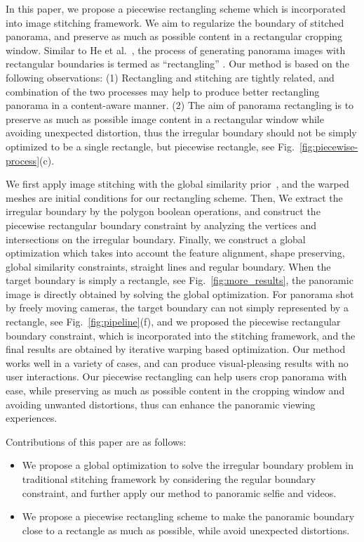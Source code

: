 \documentclass[10pt,journal,compsoc]{IEEEtran}
\begin{document}
In this paper, we propose a piecewise rectangling scheme which is incorporated into image stitching framework.
We aim to regularize the boundary of stitched panorama, and preserve as much as possible content in a  rectangular cropping window.
Similar to He et al.~\cite{journals/tog/HeC013}, the process of generating panorama images with rectangular boundaries is termed as ``rectangling'' . Our method is based on the following observations:
(1) Rectangling and stitching are tightly related, and combination of the two processes may help to produce better rectangling panorama in a content-aware manner.
(2) The aim of panorama rectangling is to preserve as much as possible image content in a rectangular window while avoiding unexpected distortion, thus the irregular boundary should not be simply optimized to be a single rectangle, but piecewise rectangle, see Fig.~\ref{fig:piecewise-process}(c).

We first apply image stitching with the global similarity prior~\cite{conf/eccv/ChenC16}, and the warped meshes are initial conditions for our rectangling scheme.
Then, We extract the irregular boundary by the polygon boolean operations, and construct the piecewise rectangular boundary constraint by analyzing the vertices and intersections on the irregular boundary.
Finally, we construct a global optimization which takes into account the feature alignment, shape preserving, global similarity constraints, straight lines and  regular boundary.
When the target boundary is simply a rectangle, see Fig.~\ref{fig:more_results}, the panoramic image is directly obtained by solving the global optimization.
For panorama shot by freely moving cameras, the target boundary can not simply represented by a rectangle, see Fig.~\ref{fig:pipeline}(f), and we proposed the piecewise rectangular boundary constraint, which is incorporated into the stitching framework, and the final results are obtained by iterative warping based optimization.
Our method works well in a variety of cases, and can produce visual-pleasing results with no user interactions.
Our piecewise rectangling can help users crop panorama with ease, while preserving as much as possible content in the cropping window and avoiding unwanted distortions, thus can enhance the panoramic viewing experiences.

Contributions of this paper are as follows:
\begin{itemize}
   \item We propose a global optimization to solve the irregular boundary problem in traditional stitching framework by considering the regular boundary constraint, and further apply our method to panoramic selfie and videos.
   \item We propose a piecewise rectangling scheme to make the panoramic boundary close to a rectangle as much as possible, while avoid unexpected distortions.
\end{itemize}
\end{document}
